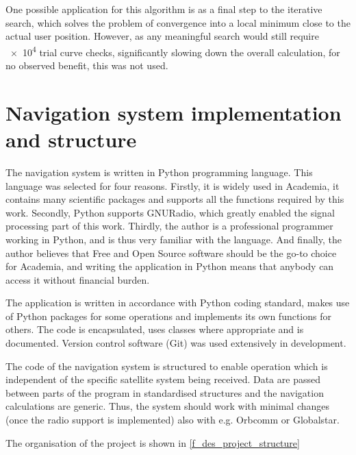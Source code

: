 One possible application for this algorithm is as a final step to the iterative search, which solves the problem of convergence into a local minimum close to the actual user position. However, as any meaningful search would still require \num{e4} trial curve checks, significantly slowing down the overall calculation, for no observed benefit, this was not used.


\section{Navigation system implementation and structure}
The navigation system is written in Python programming language. This language was selected for four reasons. Firstly, it is widely used in Academia, it contains many scientific packages and supports all the functions required by this work. Secondly, Python supports GNURadio, which greatly enabled the signal processing part of this work. Thirdly, the author is a professional programmer working in Python, and is thus very familiar with the language. And finally, the author believes that Free and Open Source software should be the go-to choice for Academia, and writing the application in Python means that anybody can access it without financial burden.

The application is written in accordance with Python coding standard, makes use of Python packages for some operations and implements its own functions for others. The code is encapsulated, uses classes where appropriate and is documented. Version control software (Git) was used extensively in development.

The code of the navigation system is structured to enable operation which is independent of the specific satellite system being received. Data are passed between parts of the program in standardised structures and the navigation calculations are generic. Thus, the system should work with minimal changes (once the radio support is implemented) also with e.g. Orbcomm or Globalstar.

The organisation of the project is shown in \autoref{f_des_project_structure}

